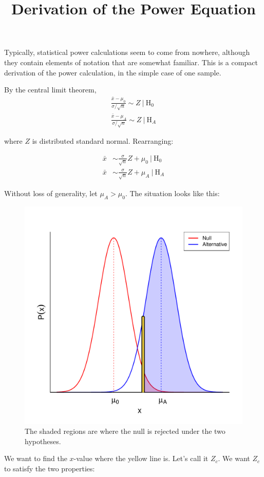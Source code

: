 \documentclass{article}
\title{Derivation of the Power Equation}
\date{}
\begin{document}
\maketitle

Typically, statistical power calculations seem to come from nowhere, although they contain elements of notation that are somewhat familiar. This is a compact derivation of the power calculation, in the simple case of one sample.

By the central limit theorem,
\begin{align*}
\frac{\bar{x} - \mu_0}{\sigma/\sqrt{n}}  \sim Z\ \big|\ \text{H}_0 \\
\frac{\bar{x} - \mu_A}{\sigma/\sqrt{n}}  \sim Z\ \big|\ \text{H}_A
\end{align*}

where $Z$ is distributed standard normal. Rearranging:

\begin{align*}
\bar{x} &\sim \frac{\sigma}{\sqrt{n}}Z + \mu_0\ \big|\ \text{H}_0 \\
\bar{x} &\sim \frac{\sigma}{\sqrt{n}}Z + \mu_A\ \big|\ \text{H}_A
\end{align*}

Without loss of generality, let $\mu_A > \mu_0$. The situation looks like this:

\begin{figure}[H]
    \centering
    \includegraphics[width=0.7\linewidth]{normals.pdf}
    \caption*{The shaded regions are where the null is rejected under the two hypotheses.}
\end{figure}

We want to find the $x$-value where the yellow line is. Let's call it $Z_c$. We want $Z_c$ to satisfy the two properties:
\end{document}
